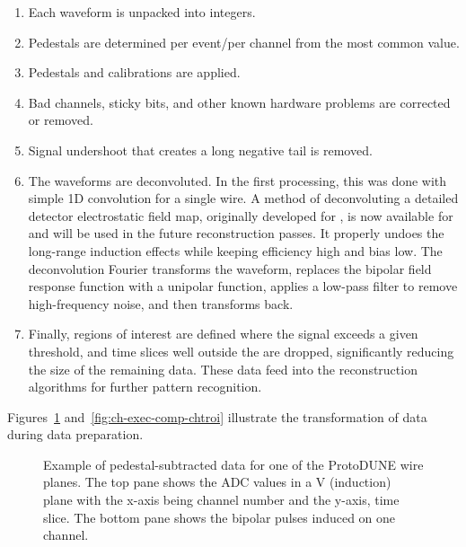 \begin{enumerate}
\item Each waveform is unpacked into integers.
\item Pedestals are determined per event/per channel from the most common  value. 
\item Pedestals and calibrations are applied. %
\item Bad channels, sticky bits, and other known hardware problems are corrected or removed.
\item Signal undershoot that creates a long negative tail is removed. 
\item The waveforms  are deconvoluted.  In the first processing, this was done with simple 1D  convolution for a single wire.  A \twod  method of deconvoluting a detailed detector electrostatic field map, originally developed for \cite{Adams:2018dra}, is  now available for  and will be used in the future reconstruction passes.  It properly undoes the long-range induction effects while keeping efficiency high and bias low.  The deconvolution Fourier transforms the waveform, replaces the  bipolar field response function with a unipolar function, applies a low-pass filter to remove high-frequency noise, and then transforms back.





\item Finally, regions of interest are defined where the signal exceeds a given threshold, and time slices well outside the  are dropped, significantly reducing the size of the remaining data. These data feed into the reconstruction algorithms for further pattern recognition. %
\end{enumerate}


Figures~\ref{fig:ch-exec-comp-chtraw} and~\ref{fig:ch-exec-comp-chtroi} illustrate the transformation of  data  during data preparation.

\begin{figure}[t]
\caption{Example of pedestal-subtracted data for one of the ProtoDUNE  wire planes.  The top pane shows the ADC values in a V (induction) plane with the x-axis being channel number and the y-axis, time slice. The bottom pane shows the bipolar pulses induced on one channel. 
}
\label{fig:ch-exec-comp-chtraw}
\end{figure}

